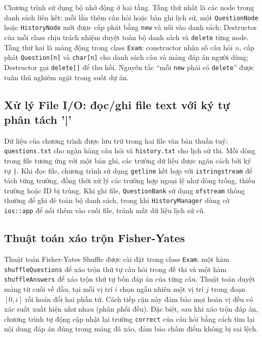 \documentclass[11pt]{report}
\begin{document}
Chương trình sử dụng bộ nhớ động ở hai tầng. Tầng thứ nhất là các node trong danh sách liên kết: mỗi lần thêm câu hỏi hoặc bản ghi lịch sử, một \texttt{QuestionNode} hoặc \texttt{HistoryNode} mới được cấp phát bằng \texttt{new} và nối vào danh sách; Destructor của mỗi class chịu trách nhiệm duyệt toàn bộ danh sách và \texttt{delete} từng node. Tầng thứ hai là mảng động trong class \texttt{Exam}: constructor nhận số câu hỏi $n$, cấp phát \texttt{Question[n]} và \texttt{char[n]} cho danh sách câu và mảng đáp án người dùng; Destructor gọi \texttt{delete[]} để thu hồi. Nguyên tắc ``mỗi \texttt{new} phải có \texttt{delete}'' được tuân thủ nghiêm ngặt trong suốt dự án.

\subsection{Xử lý File I/O: đọc/ghi file text với ký tự phân tách '|'}

Dữ liệu của chương trình được lưu trữ trong hai file văn bản thuần tuý: \texttt{questions.txt} cho ngân hàng câu hỏi và \texttt{history.txt} cho lịch sử thi. Mỗi dòng trong file tương ứng với một bản ghi, các trường dữ liệu được ngăn cách bởi ký tự \texttt{|}. Khi đọc file, chương trình sử dụng \texttt{getline} kết hợp với \texttt{istringstream} để tách từng trường, đồng thời xử lý các trường hợp ngoại lệ như dòng trống, thiếu trường hoặc ID bị trùng. Khi ghi file, \texttt{QuestionBank} sử dụng \texttt{ofstream} thông thường để ghi đè toàn bộ danh sách, trong khi \texttt{HistoryManager} dùng cờ \texttt{ios::app} để nối thêm vào cuối file, tránh mất dữ liệu lịch sử cũ.

\subsection{Thuật toán xáo trộn Fisher-Yates}

Thuật toán Fisher-Yates Shuffle được cài đặt trong class \texttt{Exam}: một hàm \texttt{shuffleQuestions} để xáo trộn thứ tự câu hỏi trong đề thi và một hàm \texttt{shuffleAnswers} để xáo trộn thứ tự bốn đáp án của từng câu. Thuật toán duyệt mảng từ cuối về đầu, tại mỗi vị trí $i$ chọn ngẫu nhiên một vị trí $j$ trong đoạn $[0, i]$ rồi hoán đổi hai phần tử. Cách tiếp cận này đảm bảo mọi hoán vị đều có xác suất xuất hiện như nhau (phân phối đều). Đặc biệt, sau khi xáo trộn đáp án, chương trình tự động cập nhật lại trường \texttt{correct} của câu hỏi bằng cách tìm lại nội dung đáp án đúng trong mảng đã xáo, đảm bảo chấm điểm không bị sai lệch.
\end{document}
